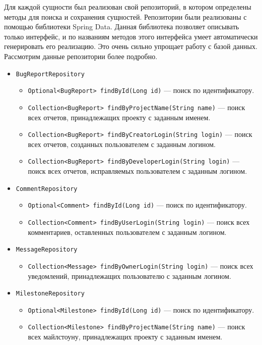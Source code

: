 Для каждой сущности был реализован свой репозиторий, в котором определены методы для поиска и сохранения сущностей. Репозитории были реализованы с помощью библиотеки Spring Data. Данная библиотека позволяет описывать только интерфейс, и по названиям методов этого интерфейса умеет автоматически генерировать его реализацию. Это очень сильно упрощает работу с базой данных. Рассмотрим данные репозитории более подробно.
\begin{itemize}
\item \texttt{BugReportRepository}
	\begin{itemize}
	\item \texttt{Optional<BugReport> findById(Long id)} --- поиск по идентификатору.
	\item \texttt{Collection<BugReport> findByProjectName(String name)} --- поиск всех отчетов, принадлежащих проекту с заданным именем.
	\item \texttt{Collection<BugReport> findByCreatorLogin(String login)} --- поиск всех отчетов, созданных пользователем с заданным логином.
	\item \texttt{Collection<BugReport> findByDeveloperLogin(String login)} --- поиск всех отчетов, исправляемых пользователем с заданным логином.	
	\end{itemize}
	
\item \texttt{CommentRepository}
	\begin{itemize}
	\item \texttt{Optional<Comment> findById(Long id)} --- поиск по идентификатору.
	\item \texttt{Collection<Comment> findByUserLogin(String login)} --- поиск всех комментариев, оставленных пользователем с заданным логином.
	\end{itemize}
	
\item \texttt{MessageRepository}
	\begin{itemize}
	\item \texttt{Collection<Message> findByOwnerLogin(String login)} --- поиск всех уведомлений, принадлежащих пользователю с заданным логином.
	\end{itemize}
	
\item \texttt{MilestoneRepository}
	\begin{itemize}
	\item \texttt{Optional<Milestone> findById(Long id)} --- поиск по идентификатору.
	\item \texttt{Collection<Milestone> findByProjectName(String name)} --- поиск всех майлстоуну, принадлежащих проекту с заданным именем.
	\end{itemize}
	

\end{itemize}
